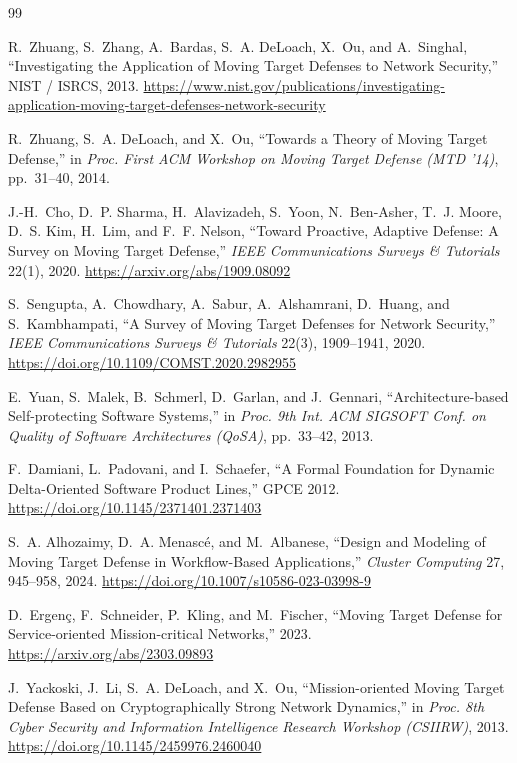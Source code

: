 \documentclass[11pt,letterpaper]{article}
\begin{document}
\small
\begin{thebibliography}{99}\setlength{\itemsep}{1pt}

 R.~Zhuang, S.~Zhang, A.~Bardas, S.~A. DeLoach, X.~Ou, and A.~Singhal, ``Investigating the Application of Moving Target Defenses to Network Security,'' NIST / ISRCS, 2013. \url{https://www.nist.gov/publications/investigating-application-moving-target-defenses-network-security}

 R.~Zhuang, S.~A. DeLoach, and X.~Ou, ``Towards a Theory of Moving Target Defense,'' in \emph{Proc. First ACM Workshop on Moving Target Defense (MTD '14)}, pp.~31--40, 2014.

 J.-H.~Cho, D.~P. Sharma, H.~Alavizadeh, S.~Yoon, N.~Ben-Asher, T.~J. Moore, D.~S. Kim, H.~Lim, and F.~F. Nelson, ``Toward Proactive, Adaptive Defense: A Survey on Moving Target Defense,'' \emph{IEEE Communications Surveys \& Tutorials} 22(1), 2020. \url{https://arxiv.org/abs/1909.08092}

 S.~Sengupta, A.~Chowdhary, A.~Sabur, A.~Alshamrani, D.~Huang, and S.~Kambhampati, ``A Survey of Moving Target Defenses for Network Security,'' \emph{IEEE Communications Surveys \& Tutorials} 22(3), 1909--1941, 2020. \url{https://doi.org/10.1109/COMST.2020.2982955}

 E.~Yuan, S.~Malek, B.~Schmerl, D.~Garlan, and J.~Gennari, ``Architecture-based Self-protecting Software Systems,'' in \emph{Proc. 9th Int. ACM SIGSOFT Conf. on Quality of Software Architectures (QoSA)}, pp.~33--42, 2013.

 F.~Damiani, L.~Padovani, and I.~Schaefer, ``A Formal Foundation for Dynamic Delta-Oriented Software Product Lines,'' GPCE 2012. \url{https://doi.org/10.1145/2371401.2371403}

 S.~A. Alhozaimy, D.~A. Menasc\'e, and M.~Albanese, ``Design and Modeling of Moving Target Defense in Workflow-Based Applications,'' \emph{Cluster Computing} 27, 945--958, 2024. \url{https://doi.org/10.1007/s10586-023-03998-9}

 D.~Ergen\c{c}, F.~Schneider, P.~Kling, and M.~Fischer, ``Moving Target Defense for Service-oriented Mission-critical Networks,'' 2023. \url{https://arxiv.org/abs/2303.09893}

 J.~Yackoski, J.~Li, S.~A. DeLoach, and X.~Ou, ``Mission-oriented Moving Target Defense Based on Cryptographically Strong Network Dynamics,'' in \emph{Proc. 8th Cyber Security and Information Intelligence Research Workshop (CSIIRW)}, 2013. \url{https://doi.org/10.1145/2459976.2460040}


\end{thebibliography}
\end{document}
